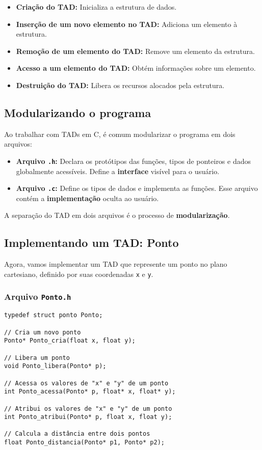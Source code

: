 \begin{itemize}
    \item \textbf{Criação do TAD:} Inicializa a estrutura de dados.
    \item \textbf{Inserção de um novo elemento no TAD:} Adiciona um elemento à estrutura.
    \item \textbf{Remoção de um elemento do TAD:} Remove um elemento da estrutura.
    \item \textbf{Acesso a um elemento do TAD:} Obtém informações sobre um elemento.
    \item \textbf{Destruição do TAD:} Libera os recursos alocados pela estrutura.
\end{itemize}

\subsection{Modularizando o programa}

Ao trabalhar com TADs em C, é comum modularizar o programa em dois arquivos:

\begin{itemize}
    \item \textbf{Arquivo \texttt{.h}:} Declara os protótipos das funções, tipos de ponteiros e dados globalmente acessíveis. Define a \textbf{interface} visível para o usuário.
    \item \textbf{Arquivo \texttt{.c}:} Define os tipos de dados e implementa as funções. Esse arquivo contém a \textbf{implementação} oculta ao usuário.
\end{itemize}

A separação do TAD em dois arquivos é o processo de \textbf{modularização}.

\subsection{Implementando um TAD: Ponto}

Agora, vamos implementar um TAD que represente um ponto no plano cartesiano, definido por suas coordenadas \texttt{x} e \texttt{y}.

\subsubsection{Arquivo \texttt{Ponto.h}}

\begin{verbatim}
typedef struct ponto Ponto;

// Cria um novo ponto
Ponto* Ponto_cria(float x, float y);

// Libera um ponto
void Ponto_libera(Ponto* p);

// Acessa os valores de "x" e "y" de um ponto
int Ponto_acessa(Ponto* p, float* x, float* y);

// Atribui os valores de "x" e "y" de um ponto
int Ponto_atribui(Ponto* p, float x, float y);

// Calcula a distância entre dois pontos
float Ponto_distancia(Ponto* p1, Ponto* p2);
\end{verbatim}

